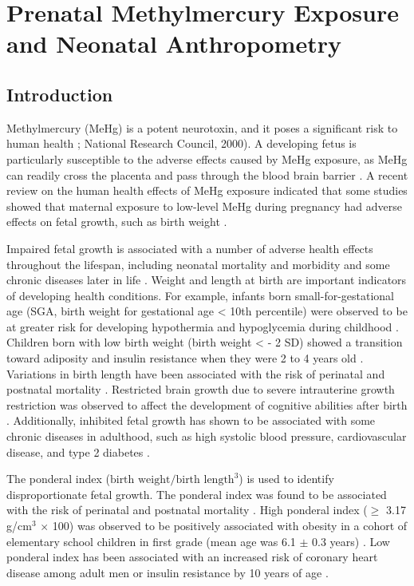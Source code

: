 \chapter{Prenatal Methylmercury Exposure and Neonatal Anthropometry}

\section{Introduction}

Methylmercury (MeHg) is a potent neurotoxin, and it poses a significant risk to human health \citep{mergler2007methylmercury}; National Research Council, 2000). A developing fetus is particularly susceptible to the adverse effects caused by MeHg exposure, as MeHg can readily cross the placenta and pass through the blood brain barrier \citep{clarkson2006toxicology}. A recent review on the human health effects of MeHg exposure indicated that some studies showed that maternal exposure to low-level MeHg during pregnancy had adverse effects on fetal growth, such as birth weight \citep{karagas2012evidence}.

Impaired fetal growth is associated with a number of adverse health effects throughout the lifespan, including neonatal mortality and morbidity \citep{bernstein2000morbidity} and some chronic diseases later in life \citep{barker2006adult,kajantie2005size}. Weight and length at birth are important indicators of developing health conditions. For example, infants born small-for-gestational age (SGA, birth weight for gestational age < 10th percentile) were observed to be at greater risk for developing hypothermia and hypoglycemia during childhood \citep{doctor2001perinatal}. Children born with low birth weight (birth weight < - 2 SD) showed a transition toward adiposity and insulin resistance when they were 2 to 4 years old \citep{ibanez2006early}. Variations in birth length have been associated with the risk of perinatal and postnatal mortality \cite{melve2000infants,cheung2002size}. Restricted brain growth due to severe intrauterine growth restriction was observed to affect the development of cognitive abilities after birth \cite{frisk2002importance}. Additionally, inhibited fetal growth has shown to be associated with some chronic diseases in adulthood, such as high systolic blood pressure,
cardiovascular disease, and type 2 diabetes \citep{barker2006adult}.

The ponderal index (\(\text{birth weight} / \text{birth length}^{3}\)) is used to identify disproportionate fetal growth. The ponderal index was found to be associated with the risk of perinatal and postnatal mortality \citep{cheung2002size}. High ponderal index (${\ge}$ 3.17 g/cm$^{3}$ ${\times}$ 100) was observed to be positively associated with obesity in a cohort of elementary school children in first grade (mean age was 6.1 \({\pm}\) 0.3 years) \cite{loaiza2011birth}. Low ponderal index has been associated with an increased risk of coronary heart disease among adult men \citep{eriksson2001size} or insulin resistance by 10 years of age \citep{larnkjaer2011thin}.

